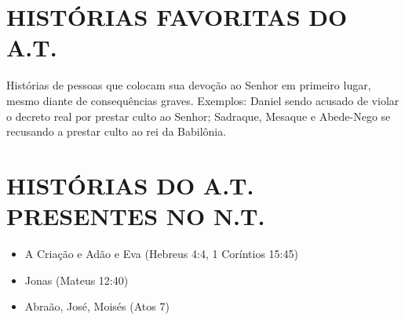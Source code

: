 \documentclass[
    article,            %
	12pt,				%
	oneside,			%
	a4paper,			%
	chapter=TITLE,		%
	section=TITLE,		%
	english,			%
	french,				%
	spanish,			%
	brazil				%
	]{abntex2}
\begin{document}



\imprimircapa

\imprimirfolhaderosto


\textual
\pagestyle{simple}





\section*{HISTÓRIAS FAVORITAS DO A.T.}
Histórias de pessoas que colocam sua devoção ao Senhor em primeiro lugar, mesmo diante de consequências graves. Exemplos: Daniel sendo acusado de violar o decreto real por prestar culto ao Senhor; Sadraque, Mesaque e Abede-Nego se recusando a prestar culto ao rei da Babilônia.

\section*{HISTÓRIAS DO A.T. PRESENTES NO N.T.}
\begin{itemize}
	\item A Criação e Adão e Eva (Hebreus 4:4, 1 Coríntios 15:45)
	\item Jonas (Mateus 12:40)
	\item Abraão, José, Moisés (Atos 7)
  \end{itemize}
\end{document}
